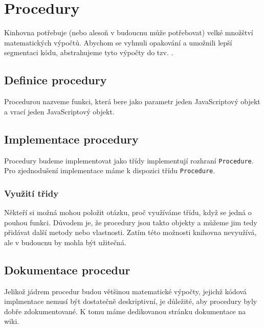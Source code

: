 \chapter{Procedury}
\label{chap:procedures}

Kinhovna potřebuje (nebo alesoň v budoucnu může potřebovat) velké množštví matematických výpočtů.
Abychom se vyhnuli opakování a umožnili lepší segmentaci kódu, abstrahujeme tyto výpočty do tzv. \cite{geometryjs:wiki:procedures}.

\section[Definice]{Definice procedury}
\label{sec:procedure-definition}

Procedurou nazveme  funkci, která bere jako parametr jeden JavaScriptový objekt a vrací jeden JavaScriptový objekt\cite{geometryjs:wiki:procedures}.

\section[Implementace]{Implementace procedury}
\label{sec:procedure-implementation}

Procedury budeme implementovat jako třídy implementují rozhraní \texttt{Procedure}\cite{geometryjs:source:interfaces:procedure.ts}.
Pro zjednodušení implementace máme k dispozici třídu \texttt{Procedure}\cite{geometryjs:source:procedures:procedure.ts}.

\subsection{Využití třidy}
\label{subsec:procedure-usage-of-class}

Někteří si možná mohou položit otázku, proč využíváme třídu, když se jedná o pouhou funkci.
Důvodem je, že procedury jsou takto objekty a můžeme jim tedy přidávat další metody nebo vlastnosti.
Zatím této možnosti knihovna nevyužívá\cite{geometryjs:source:procedures:procedure.ts}, ale v budoucnu by mohla být užitečná.

\section[Dokumentace]{Dokumentace procedur}
\label{sec:procedure-documentation}

Jelikož jádrem procedur budou většinou matematické výpočty, jejichž kódová implmentace nemusí být dostatečně deskriptivní, je důležité, aby procedury byly dobře zdokumentované.
K tomu máme dedikovanou stránku dokumentace na wiki\cite{geometryjs:wiki:procedures}.

